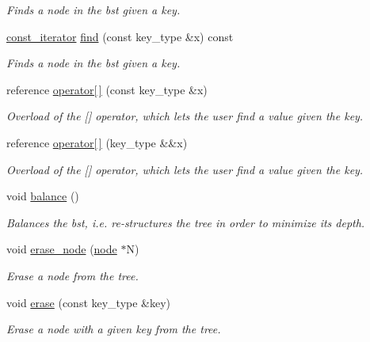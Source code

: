 \begin{DoxyCompactItemize}
\begin{DoxyCompactList}\small\item\em Finds a node in the bst given a key. \end{DoxyCompactList}\item 
\hyperlink{classbst_1_1__iterator}{const\+\_\+iterator} \hyperlink{classbst_a3725b44098e3328e5b4c907dc0992953}{find} (const key\+\_\+type \&x) const
\begin{DoxyCompactList}\small\item\em Finds a node in the bst given a key. \end{DoxyCompactList}\item 
reference \hyperlink{classbst_ad709ae2eca191484456d42774f1b3466}{operator\mbox{[}$\,$\mbox{]}} (const key\+\_\+type \&x)
\begin{DoxyCompactList}\small\item\em Overload of the \mbox{[}\mbox{]} operator, which lets the user find a value given the key. \end{DoxyCompactList}\item 
reference \hyperlink{classbst_a74bb6424a0e67fab1df7b3a8f99ab108}{operator\mbox{[}$\,$\mbox{]}} (key\+\_\+type \&\&x)
\begin{DoxyCompactList}\small\item\em Overload of the \mbox{[}\mbox{]} operator, which lets the user find a value given the key. \end{DoxyCompactList}\item 
\mbox{\label{classbst_ac17d2f7183bb2e15c85f3c8f60651c56}} 
void \hyperlink{classbst_ac17d2f7183bb2e15c85f3c8f60651c56}{balance} ()
\begin{DoxyCompactList}\small\item\em Balances the bst, i.\+e. re-\/structures the tree in order to minimize its depth. \end{DoxyCompactList}\item 
void \hyperlink{classbst_a02680e885b7fda951341d8ee2de2df32}{erase\+\_\+node} (\hyperlink{structbst_1_1node}{node} $\ast$N)
\begin{DoxyCompactList}\small\item\em Erase a node from the tree. \end{DoxyCompactList}\item 
void \hyperlink{classbst_a7ba6cc2f31ec7cba0602b395399435bb}{erase} (const key\+\_\+type \&key)
\begin{DoxyCompactList}\small\item\em Erase a node with a given key from the tree. \end{DoxyCompactList}\item 

\end{DoxyCompactItemize}
